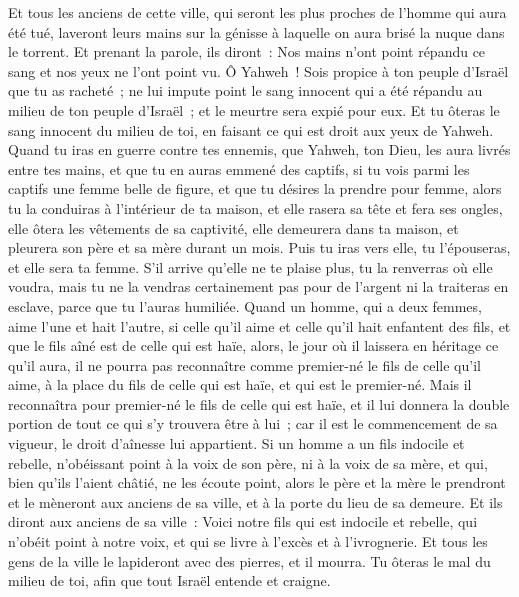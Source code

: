 \begin{multicols}{2}
Et tous les anciens de cette ville, qui seront les plus proches de l'homme qui aura été tué, laveront leurs mains sur la génisse à laquelle on aura brisé la nuque dans le torrent.
Et prenant la parole, ils diront~: Nos mains n'ont point répandu ce sang et nos yeux ne l'ont point vu.
Ô Yahweh~! Sois propice à ton peuple d'Israël que tu as racheté~; ne lui impute point le sang innocent qui a été répandu au milieu de ton peuple d'Israël~; et le meurtre sera expié pour eux.
Et tu ôteras le sang innocent du milieu de toi, en faisant ce qui est droit aux yeux de Yahweh.
Quand tu iras en guerre contre tes ennemis, que Yahweh, ton Dieu, les aura livrés entre tes mains, et que tu en auras emmené des captifs,
si tu vois parmi les captifs une femme belle de figure, et que tu désires la prendre pour femme,
alors tu la conduiras à l'intérieur de ta maison, et elle rasera sa tête et fera ses ongles,
elle ôtera les vêtements de sa captivité, elle demeurera dans ta maison, et pleurera son père et sa mère durant un mois. Puis tu iras vers elle, tu l'épouseras, et elle sera ta femme.
S'il arrive qu'elle ne te plaise plus, tu la renverras où elle voudra, mais tu ne la vendras certainement pas pour de l'argent ni la traiteras en esclave, parce que tu l'auras humiliée.
Quand un homme, qui a deux femmes, aime l'une et hait l'autre, si celle qu'il aime et celle qu'il hait enfantent des fils, et que le fils aîné est de celle qui est haïe,
alors, le jour où il laissera en héritage ce qu'il aura, il ne pourra pas reconnaître comme premier-né le fils de celle qu'il aime, à la place du fils de celle qui est haïe, et qui est le premier-né.
Mais il reconnaîtra pour premier-né le fils de celle qui est haïe, et il lui donnera la double portion de tout ce qui s'y trouvera être à lui~; car il est le commencement de sa vigueur, le droit d'aînesse lui appartient.
Si un homme a un fils indocile et rebelle, n'obéissant point à la voix de son père, ni à la voix de sa mère, et qui, bien qu'ils l'aient châtié, ne les écoute point,
alors le père et la mère le prendront et le mèneront aux anciens de sa ville, et à la porte du lieu de sa demeure.
Et ils diront aux anciens de sa ville~: Voici notre fils qui est indocile et rebelle, qui n'obéit point à notre voix, et qui se livre à l'excès et à l'ivrognerie.
Et tous les gens de la ville le lapideront avec des pierres, et il mourra. Tu ôteras le mal du milieu de toi, afin que tout Israël entende et craigne.

\end{multicols}
